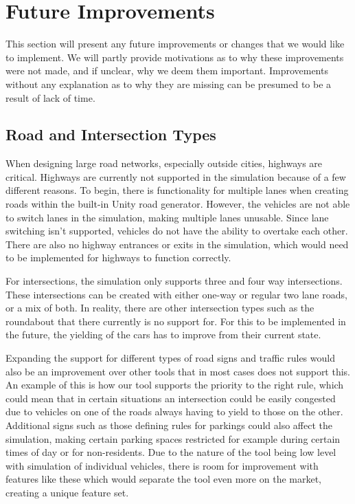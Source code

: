 \section{Future Improvements}
    This section will present any future improvements or changes that we would like to implement. We will partly provide motivations as to why these improvements were not made, and if unclear, why we deem them important. Improvements without any explanation as to why they are missing can be presumed to be a result of lack of time.
    
    \subsection{Road and Intersection Types}
        When designing large road networks, especially outside cities, highways are critical. Highways are currently not supported in the simulation because of a few different reasons. To begin, there is functionality for multiple lanes when creating roads within the built-in Unity road generator. However, the vehicles are not able to switch lanes in the simulation, making multiple lanes unusable. Since lane switching isn't supported, vehicles do not have the ability to overtake each other. There are also no highway entrances or exits in the simulation, which would need to be implemented for highways to function correctly.

        For intersections, the simulation only supports three and four way intersections. These intersections can be created with either one-way or regular two lane roads, or a mix of both. In reality, there are other intersection types such as the roundabout that there currently is no support for. For this to be implemented in the future, the yielding of the cars has to improve from their current state.

         Expanding the support for different types of road signs and traffic rules would also be an improvement over other tools that in most cases does not support this. An example of this is how our tool supports the priority to the right rule, which could mean that in certain situations an intersection could be easily congested due to vehicles on one of the roads always having to yield to those on the other. Additional signs such as those defining rules for parkings could also affect the simulation, making certain parking spaces restricted for example during certain times of day or for non-residents. Due to the nature of the tool being low level with simulation of individual vehicles, there is room for improvement with features like these which would separate the tool even more on the market, creating a unique feature set.

